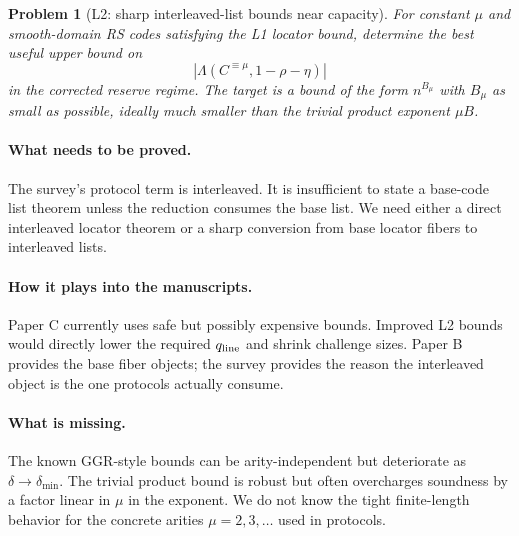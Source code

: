 \documentclass[11pt]{article}
\newtheorem{problem}[theorem]{Problem}
\theoremstyle{definition}
\theoremstyle{remark}
\newcommand{\Int}[2]{#1^{\equiv #2}}
\newcommand{\qline}{q_{\rm line}}
\newcommand{\paperB}{Paper B}
\newcommand{\paperC}{Paper C}
\begin{document}
\begin{problem}[L2: sharp interleaved-list bounds near capacity]
\label{prob:L2}
For constant $\mu$ and smooth-domain RS codes satisfying the L1 locator bound, determine the best useful upper bound on
\[
        |\Lambda(\Int{C}{\mu},1-\rho-\eta)|
\]
in the corrected reserve regime.  The target is a bound of the form $n^{B_\mu}$ with $B_\mu$ as small as possible, ideally much smaller than the trivial product exponent $\mu B$.
\end{problem}

\paragraph{What needs to be proved.}  The survey's protocol term is interleaved.  It is insufficient to state a base-code list theorem unless the reduction consumes the base list.  We need either a direct interleaved locator theorem or a sharp conversion from base locator fibers to interleaved lists.

\paragraph{How it plays into the manuscripts.}  \paperC{} currently uses safe but possibly expensive bounds.  Improved L2 bounds would directly lower the required $\qline$ and shrink challenge sizes.  \paperB{} provides the base fiber objects; the survey provides the reason the interleaved object is the one protocols actually consume.

\paragraph{What is missing.}  The known GGR-style bounds \cite{GGR11} can be arity-independent but deteriorate as $\delta\to\delta_{\min}$.  The trivial product bound is robust but often overcharges soundness by a factor linear in $\mu$ in the exponent.  We do not know the tight finite-length behavior for the concrete arities $\mu=2,3,\ldots$ used in protocols.
\end{document}
